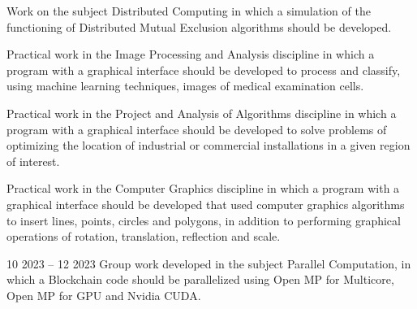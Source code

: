 \documentclass[10pt,a4paper,ragged2e,withhyper]{altacv}
\begin{document}
\begin{paracol}{2}
            Work on the subject Distributed Computing in which a simulation of the functioning of Distributed Mutual Exclusion algorithms should be developed.\\
            \divider

            Practical work in the Image Processing and Analysis discipline in which a program with a graphical interface should be developed to process and classify, using machine learning techniques, images of medical examination cells.\\
            \divider
            
            Practical work in the Project and Analysis of Algorithms discipline in which a program with a graphical interface should be developed to solve problems of optimizing the location of industrial or commercial installations in a given region of interest.\\
            \divider

            Practical work in the Computer Graphics discipline in which a program with a graphical interface should be developed that used computer graphics algorithms to insert lines, points, circles and polygons, in addition to performing graphical operations of rotation, translation, reflection and scale.\\
            \divider

            {
            }{10 2023 -- 12 2023}{}
            Group work developed in the subject Parallel Computation, in which a Blockchain code should be parallelized using Open MP for Multicore, Open MP for GPU and Nvidia CUDA.\\
            \divider


\end{paracol}
\end{document}
